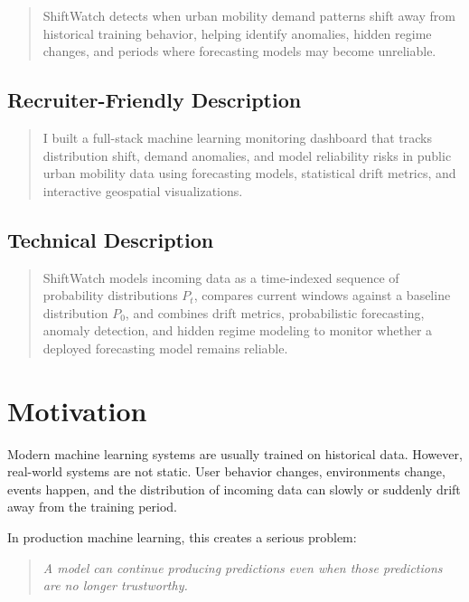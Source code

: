\documentclass[11pt]{article}
\begin{document}
\begin{quote}
    ShiftWatch detects when urban mobility demand patterns shift away from historical training behavior, helping identify anomalies, hidden regime changes, and periods where forecasting models may become unreliable.
\end{quote}

\subsection{Recruiter-Friendly Description}

\begin{quote}
    I built a full-stack machine learning monitoring dashboard that tracks distribution shift, demand anomalies, and model reliability risks in public urban mobility data using forecasting models, statistical drift metrics, and interactive geospatial visualizations.
\end{quote}

\subsection{Technical Description}

\begin{quote}
    ShiftWatch models incoming data as a time-indexed sequence of probability distributions $P_t$, compares current windows against a baseline distribution $P_0$, and combines drift metrics, probabilistic forecasting, anomaly detection, and hidden regime modeling to monitor whether a deployed forecasting model remains reliable.
\end{quote}

\section{Motivation}

Modern machine learning systems are usually trained on historical data. However, real-world systems are not static. User behavior changes, environments change, events happen, and the distribution of incoming data can slowly or suddenly drift away from the training period.

In production machine learning, this creates a serious problem:

\begin{quote}
    \textit{A model can continue producing predictions even when those predictions are no longer trustworthy.}
\end{quote}
\end{document}
